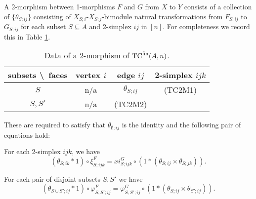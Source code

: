 \documentclass{amsart}
\begin{document}
\begin{list}{(TC1M)}{}
\begin{figure}[ht]
\begin{center}
		\end{center}
		\label{fig:EqnSSSijMorphism}
	\end{figure}
\end{list}
A 2-morphism between 1-morphisms $F$ and $G$ from $X$ to $Y$ consists of a collection of $\{ \theta_{S;ij} \}$ consisting of $X_{S;i}$-$X_{S;j}$-bimodule natural transformations from $F_{S;ij}$ to $G_{S;ij}$ for each subset $S \subseteq A$ and 2-simplex $ij$ in $[n]$. For completeness we record this in Table \ref{Table:2MorOfTC}.
\begin{table}[h]
	\caption{Data of a 2-morphism of ${\mathrm{TC}^{\text{fin}}}(A,n)$.}
	\begin{tabular}{c |ccc}
	 subsets \textbackslash\ faces & vertex $i$ & edge $ij$ & 2-simplex $ijk$   \\
	\hline
	$S$ 				& n/a & $\theta_{S; ij}$ &     (TC2M1) \\
	$S, S'$ 			& n/a &  (TC2M2)  &    \\
	\end{tabular}
%	
%	
	\label{Table:2MorOfTC}
\end{table}
These are required to satisfy that $\theta_{\emptyset;ij}$ is the identity and the following pair of equations hold:
\begin{list}{(TC2M)}{}
	\item For each 2-simplex $ijk$, we have
	\begin{equation*}
		(\theta_{S; ik} * 1) \circ \xi^F_{S; ijk} = xi^G_{S;ijk} \circ (1 * (\theta_{S; ij} \times \theta_{S; jk})).
	\end{equation*}
	\item For each pair of disjoint subsets $S, S'$ we have
	\begin{equation*}
		(\theta_{S \cup S'; ij} * 1) \circ \varphi^F_{S, S'; ij} = \varphi^G_{S,S';ij} \circ (1*(\theta_{S;ij} \times \theta_{S';ij})).
	\end{equation*}
\end{list}
\end{document}
